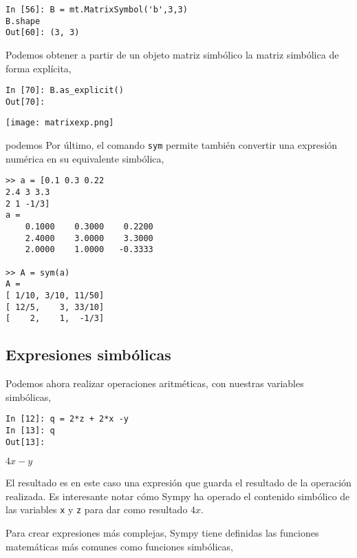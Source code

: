 \begin{center}
	\begin{minipage}{.3\textwidth}
		\begin{verbatim}
In [56]: B = mt.MatrixSymbol('b',3,3)
B.shape
Out[60]: (3, 3)				
		\end{verbatim}
	\end{minipage}
\end{center}
Podemos obtener a partir de un objeto matriz simbólico la matriz simbólica de forma explícita,
\begin{center}
	\begin{minipage}{.3\textwidth}
\begin{verbatim}
In [70]: B.as_explicit()
Out[70]:				
\end{verbatim}
\texttt{[image: matrixexp.png]}		
	\end{minipage}
\end{center} 
podemos
Por último, el comando \texttt{sym} permite también convertir una expresión numérica en su equivalente simbólica,
\begin{verbatim}
>> a = [0.1 0.3 0.22
2.4 3 3.3
2 1 -1/3]
a =
    0.1000    0.3000    0.2200
    2.4000    3.0000    3.3000
    2.0000    1.0000   -0.3333

>> A = sym(a) 
A = 
[ 1/10, 3/10, 11/50]
[ 12/5,    3, 33/10]
[    2,    1,  -1/3]
\end{verbatim}



\subsection{Expresiones simbólicas}
Podemos ahora realizar operaciones aritméticas, con nuestras variables simbólicas,

\begin{center}
\begin{minipage}{.5\textwidth}
	\begin{verbatim}
In [12]: q = 2*z + 2*x -y
In [13]: q
Out[13]: 			
	\end{verbatim}
	$4x - y$
\end{minipage}
\end{center}

\begin{paracol}{2}
El resultado es en este caso una expresión que guarda el resultado de la operación realizada. Es interesante notar cómo Sympy ha operado el contenido simbólico de las variables \texttt{x} y \texttt{z} para dar como resultado $4x$.

Para crear expresiones más complejas, Sympy tiene definidas las funciones matemáticas más comunes como funciones simbólicas,
\end{paracol}

